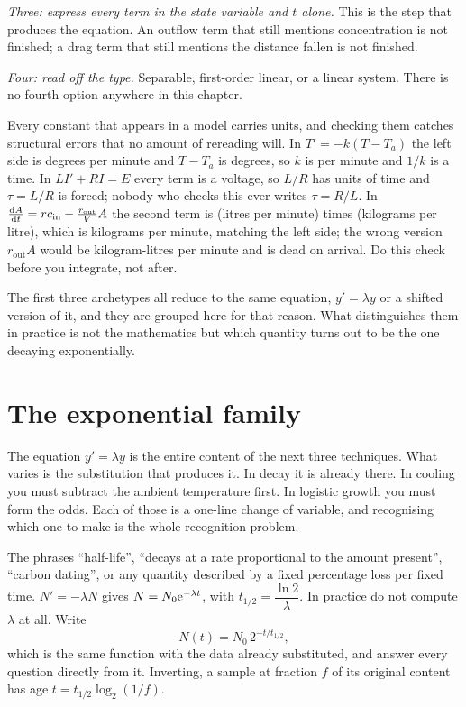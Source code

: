 \emph{Three: express every term in the state variable and $t$ alone.} This is the step that produces the equation. An outflow term that still mentions concentration is not finished; a drag term that still mentions the distance fallen is not finished.

\emph{Four: read off the type.} Separable, first-order linear, or a linear system. There is no fourth option anywhere in this chapter.

\begin{keynote}
Every constant that appears in a model carries units, and checking them catches structural errors that no amount of rereading will. In $T'=-k(T-T_a)$ the left side is degrees per minute and $T-T_a$ is degrees, so $k$ is per minute and $1/k$ is a time. In $L I'+RI=E$ every term is a voltage, so $L/R$ has units of time and $\tau=L/R$ is forced; nobody who checks this ever writes $\tau=R/L$. In $\frac{\mathrm{d}A}{\mathrm{d}t}=r c_{\text{in}}-\frac{r_{\text{out}}}{V}A$ the second term is (litres per minute) times (kilograms per litre), which is kilograms per minute, matching the left side; the wrong version $r_{\text{out}}A$ would be kilogram-litres per minute and is dead on arrival. Do this check before you integrate, not after.
\end{keynote}

The first three archetypes all reduce to the same equation, $y'=\lambda y$ or a shifted version of it, and they are grouped here for that reason. What distinguishes them in practice is not the mathematics but which quantity turns out to be the one decaying exponentially.

\section{The exponential family}

The equation $y'=\lambda y$ is the entire content of the next three techniques. What varies is the substitution that produces it. In decay it is already there. In cooling you must subtract the ambient temperature first. In logistic growth you must form the odds. Each of those is a one-line change of variable, and recognising which one to make is the whole recognition problem.

\cue The phrases ``half-life'', ``decays at a rate proportional to the amount present'', ``carbon dating'', or any quantity described by a fixed percentage loss per fixed time.
\method $N'=-\lambda N$ gives $N=N_0\mathrm{e}^{-\lambda t}$, with $t_{1/2}=\dfrac{\ln2}{\lambda}$. In practice do not compute $\lambda$ at all. Write
\[N(t)=N_0\,2^{-t/t_{1/2}},\]
which is the same function with the data already substituted, and answer every question directly from it. Inverting, a sample at fraction $f$ of its original content has age $t=t_{1/2}\log_2(1/f)$.

